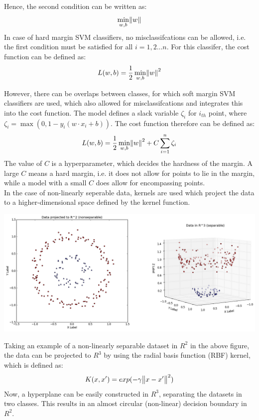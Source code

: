 \documentclass[12pt]{article}
\begin{document}
Hence, the second condition can be written as:
\begin{equation}
    \min_{w,b} \norm{w}
\end{equation}
In case of hard margin SVM classifiers, no misclassifcations can be allowed, i.e. the first condition must be satisfied for all $i=1,2 \dots n$. For this classifer, the cost function can be defined as:
\begin{equation}
    L(w,b) = \frac{1}{2} \min_{w,b} \norm{w}^2
\end{equation}

However, there can be overlaps between classes, for which soft margin SVM classifiers are used, which also allowed for misclassifcations and integrates this into the cost function.
The model defines a slack variable $\zeta_i$ for $i_{th}$ point, where $\zeta_i = \max(0,1-y_i(w \cdot x_i + b))$. 
The cost function therefore can be defined as:
\begin{equation}
    L(w,b) = \frac{1}{2} \min_{w,b} \norm{w}^2 + C \sum_{i=1}^{n} \zeta_i
\end{equation}
The value of $C$ is a hyperparameter, which decides the hardness of the margin. A large $C$ means a hard margin, i.e. it does not allow for points to lie in the margin, while a model with a small $C$ does allow for encompassing points.\\
In the case of non-linearly seperable data, kernels are used which project the data to a higher-dimensional space defined by the kernel function.
\begin{center}
    \includegraphics[width=\textwidth]{kernel.png}
\end{center}
Taking an example of a non-linearly separable dataset in $R^2$  in the above figure, the data can be projected to $R^3$ by using the radial basis function (RBF) kernel, which is defined as:
\begin{equation}
    K(x,x') = exp(-\gamma \norm{x-x'}^2)
\end{equation}
Now, a hyperplane can be easily constructed in $R^3$, separating the datasets in two classes. This results in an almost circular (non-linear) decision boundary in $R^2$.
\end{document}

